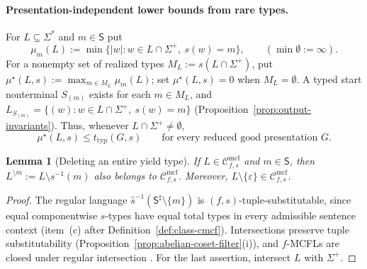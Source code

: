 \documentclass[11pt]{article}
\numberwithin{equation}{section}
\theoremstyle{plain}
\newtheorem{lemma}[theorem]{Lemma}
\theoremstyle{definition}
\theoremstyle{remark}
\newcommand{\Cmcf}[2]{\mathcal{C}^{\mathrm{mcf}}_{#1,#2}}
\newcommand{\eps}{\varepsilon}
\begin{document}
\paragraph{Presentation-independent lower bounds from rare types.}
For $L\subseteq\Sigma^*$ and $m\in\mathsf S$ put
\[
 \mu_m(L):=\min\{|w|:w\in L\cap\Sigma^+,\ s(w)=m\},
 \qquad (\min\emptyset:=\infty).
\]
For a nonempty set of realized types $M_L:=s(L\cap\Sigma^+)$, put
$\mu^\star(L,s):=\max_{m\in M_L}\mu_m(L)$; set
$\mu^\star(L,s)=0$ when $M_L=\emptyset$.  A typed start nonterminal
$S_{(m)}$ exists for each $m\in M_L$, and
$L_{S_{(m)}}=\{(w):w\in L\cap\Sigma^+,\ s(w)=m\}$
(Proposition~\ref{prop:output-invariants}). Thus, whenever
$L\cap\Sigma^+\ne\emptyset$,
\begin{equation}\label{eq:root-thickness}
 \mu^\star(L,s)\le t_{\mathrm{typ}}(G,s)
 \qquad\text{for every reduced good presentation }G.
\end{equation}

\begin{lemma}[Deleting an entire yield type]
\label{lem:type-deletion}
If $L\in\Cmcf{f}{s}$ and $m\in\mathsf S$, then
$L^{\setminus m}:=L\setminus s^{-1}(m)$ also belongs to
$\Cmcf{f}{s}$. Moreover, $L\setminus\{\eps\}\in\Cmcf{f}{s}$.
\end{lemma}
\begin{proof}
The regular language
$\widehat s^{-1}(\mathsf S^\sharp\setminus\{m\})$
is $(f,s)$-tuple-substitutable, since equal componentwise $s$-types
have equal total types in every admissible sentence context
(item~(c) after Definition~\ref{def:class-cmcf}). Intersections
preserve tuple substitutability
(Proposition~\ref{prop:abelian-coset-filter}(i)), and $f$-MCFLs
are closed under regular intersection \cite{SekiEtAl1991}.
For the last assertion, intersect $L$ with $\Sigma^+$.
\end{proof}
\end{document}
